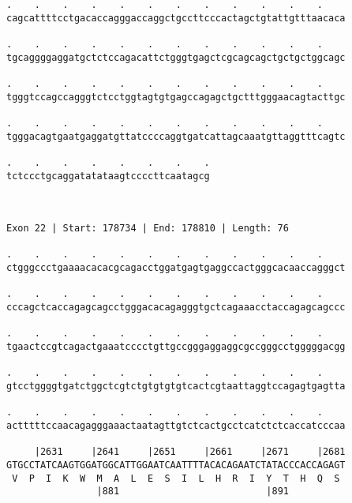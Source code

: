 \documentclass{article}
\begin{document}
\begin{Verbatim}
.    .    .    .    .    .    .    .    .    .    .    .    
cagcattttcctgacaccagggaccaggctgccttcccactagctgtattgtttaacaca
                                                            
.    .    .    .    .    .    .    .    .    .    .    .    
tgcaggggaggatgctctccagacattctgggtgagctcgcagcagctgctgctggcagc
                                                            
.    .    .    .    .    .    .    .    .    .    .    .    
tgggtccagccagggtctcctggtagtgtgagccagagctgctttgggaacagtacttgc
                                                            
.    .    .    .    .    .    .    .    .    .    .    .    
tgggacagtgaatgaggatgttatccccaggtgatcattagcaaatgttaggtttcagtc
                                                            
.    .    .    .    .    .    .    .
tctccctgcaggatatataagtccccttcaatagcg
                                    
                                    
 
Exon 22 | Start: 178734 | End: 178810 | Length: 76
 
.    .    .    .    .    .    .    .    .    .    .    .    
ctgggccctgaaaacacacgcagacctggatgagtgaggccactgggcacaaccagggct
                                                            
.    .    .    .    .    .    .    .    .    .    .    .    
cccagctcaccagagcagcctgggacacagagggtgctcagaaacctaccagagcagccc
                                                            
.    .    .    .    .    .    .    .    .    .    .    .    
tgaactccgtcagactgaaatcccctgttgccgggaggaggcgccgggcctgggggacgg
                                                            
.    .    .    .    .    .    .    .    .    .    .    .    
gtcctggggtgatctggctcgtctgtgtgtgtcactcgtaattaggtccagagtgagtta
                                                            
.    .    .    .    .    .    .    .    .    .    .    .    
actttttccaacagagggaaactaatagttgtctcactgcctcatctctcaccatcccaa
                                                            
     |2631     |2641     |2651     |2661     |2671     |2681
GTGCCTATCAAGTGGATGGCATTGGAATCAATTTTACACAGAATCTATACCCACCAGAGT
 V  P  I  K  W  M  A  L  E  S  I  L  H  R  I  Y  T  H  Q  S 
                |881                          |891          
  

\end{Verbatim}
\end{document}
